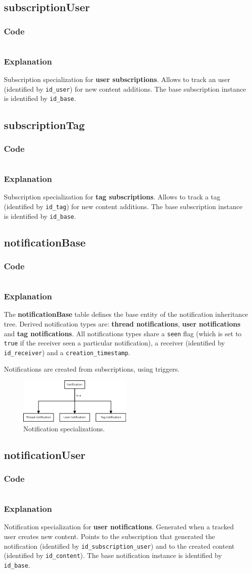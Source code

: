 \documentclass[12pt]{report}
\renewcommand\emph{\textbf}
\newcommand{\printSQLtest}[1]
{
    \inputminted[linenos, breaklines, breakbytoken, tabsize=4, fontsize=\footnotesize]{mysql}{#1}
}
\newcommand{\printSQLTablepage}[2]
{
    \newpage
    \subsection{#2}
    \subsubsection{Code}
    \printSQLtest{../sql/parts/#1}
    \subsubsection{Explanation}
}
\begin{document}
                \printSQLTablepage{13_tblSubscriptionUser.sql}{subscriptionUser}
                    Subscription specialization for \emph{user subscriptions}. Allows to track an user (identified by \texttt{id_user}) for new content additions.
                    The base subscription instance is identified by \texttt{id_base}.


                \printSQLTablepage{14_tblSubscriptionTag.sql}{subscriptionTag}
                    Subscription specialization for \emph{tag subscriptions}. Allows to track a tag (identified by \texttt{id_tag}) for new content additions.
                    The base subscription instance is identified by \texttt{id_base}.


                \printSQLTablepage{15_tblNotificationBase.sql}{notificationBase}
                    The \emph{notificationBase} table defines the base entity of the notification inheritance tree. Derived notification types are: \emph{thread notifications}, \emph{user notifications} and \emph{tag notifications}.
                    All notifications types share a \texttt{seen} flag (which is set to \texttt{true} if the receiver seen a particular notification), a receiver (identified by \texttt{id_receiver}) and a \texttt{creation_timestamp}.

                    Notifications are created from subscriptions, using triggers.

                    \begin{figure}[h]
                    \caption{Notification specializations.}
                    \centering
                    \includegraphics[width=0.5\textwidth]{td/15notificationbase}
                    \end{figure}


                \printSQLTablepage{16_tblNotificationUser.sql}{notificationUser}
                    Notification specialization for \emph{user notifications}. Generated when a tracked user creates new content. Points to the subscription that generated the notification (identified by \texttt{id_subscription_user}) and to the created content (identified by \texttt{id_content}).
                    The base notification instance is identified by \texttt{id_base}.
\end{document}
